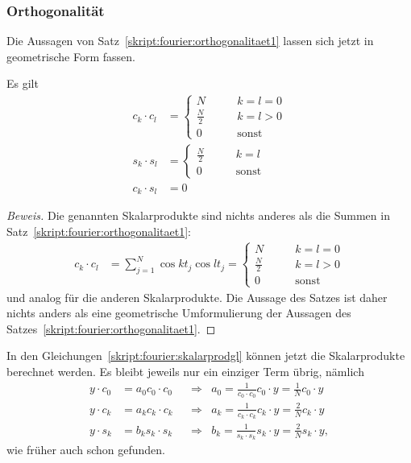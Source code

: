 \subsubsection{Orthogonalität}
Die Aussagen von Satz~\ref{skript:fourier:orthogonalitaet1}
lassen sich jetzt in geometrische Form fassen.
\begin{satz}
Es gilt
\begin{align*}
c_k\cdot c_l
&=
\begin{cases}
N&\qquad k=l=0\\
\displaystyle\frac{N}2&\qquad k=l>0\\
0&\qquad\text{sonst}
\end{cases}
\\
s_k\cdot s_l
&=
\begin{cases}
\displaystyle\frac{N}2&\qquad k=l\\
0&\qquad\text{sonst}
\end{cases}
\\
c_k\cdot s_l
&=
0
\end{align*}
\label{skript:fourier:orthogonalitaet}
\end{satz}

\begin{proof}[Beweis]
Die genannten Skalarprodukte sind nichts anderes als die Summen in
Satz~\ref{skript:fourier:orthogonalitaet1}:
\begin{align*}
c_k\cdot c_l
&=
\sum_{j=1}^N \cos kt_j \cos lt_j
=
\begin{cases}
N&\qquad k=l=0\\
\displaystyle\frac{N}2&\qquad k=l>0\\
0&\qquad\text{sonst}
\end{cases}
\end{align*}
und analog für die anderen Skalarprodukte.
Die Aussage des Satzes ist daher nichts anders als eine geometrische
Umformulierung der Aussagen des
Satzes~\ref{skript:fourier:orthogonalitaet1}.
\end{proof}

In den Gleichungen~\eqref{skript:fourier:skalarprodgl} können jetzt
die Skalarprodukte berechnet werden.
Es bleibt jeweils nur ein einziger Term übrig, nämlich
\begin{equation*}
\begin{aligned}
y\cdot c_0 &= a_0 c_0\cdot c_0
&&\Rightarrow&
a_0 = \frac{1}{c_0\cdot c_0}c_0\cdot y = \frac1N c_0\cdot y
\\
y\cdot c_k &= a_k c_k\cdot c_k
&&\Rightarrow&
a_k = \frac{1}{c_k\cdot c_k}c_k\cdot y = \frac2N c_k\cdot y
\\
y\cdot s_k &= b_k s_k\cdot s_k
&&\Rightarrow&
b_k = \frac{1}{s_k\cdot s_k}s_k\cdot y = \frac2N s_k\cdot y,
\end{aligned}
\end{equation*}
wie früher auch schon gefunden.

